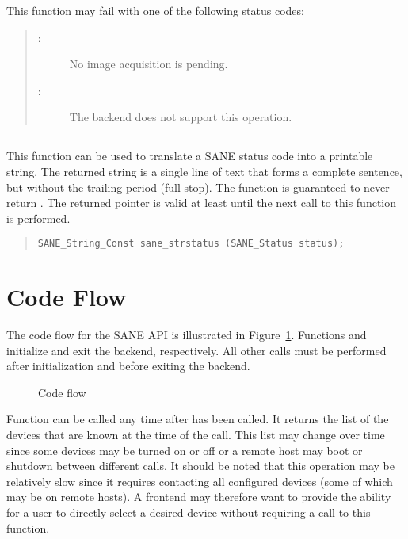 \documentclass[11pt,DVIps]{report}
\begin{document}
This function may fail with one of the following status codes:
\begin{quote}
\begin{description}
\item[:] No image acquisition is pending.
\item[:] The backend does not support
  this operation.
\end{description}
\end{quote}


\subsection{}

This function can be used to translate a SANE status code into a
printable string.  The returned string is a single line of text that
forms a complete sentence, but without the trailing period
(full-stop).  The function is guaranteed to never return .
The returned pointer is valid at least until the next call to this
function is performed.
\begin{quote}
\begin{verbatim}
SANE_String_Const sane_strstatus (SANE_Status status);
\end{verbatim}
\end{quote}

\section{Code Flow}

The code flow for the SANE API is illustrated in
Figure~\ref{fig:flow}.  Functions  and
 initialize and exit the backend, respectively.
All other calls must be performed after initialization and before
exiting the backend.

\begin{figure}[htb]
  \begin{center}
    \leavevmode
    \caption{Code flow}
    \label{fig:flow}
  \end{center}
\end{figure}

Function  can be called any time after
 has been called.  It returns the list of the
devices that are known at the time of the call.  This list may change
over time since some devices may be turned on or off or a remote host
may boot or shutdown between different calls.  It should be noted that
this operation may be relatively slow since it requires contacting all
configured devices (some of which may be on remote hosts).  A frontend
may therefore want to provide the ability for a user to directly
select a desired device without requiring a call to this function.
\end{document}
